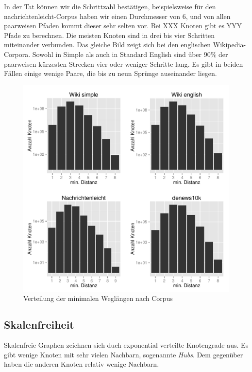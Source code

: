 \documentclass[11pt, a4paper]{article}
\begin{document}
In der Tat können wir die Schrittzahl bestätigen, beispielsweise für den
nachrichtenleicht-Corpus haben wir einen Durchmesser von 6, und von
allen paarweisen Pfaden kommt dieser sehr selten vor. Bei XXX Knoten gibt
es YYY Pfade zu berechnen. Die meisten Knoten sind in drei bis vier Schritten
miteinander verbunden.
Das gleiche Bild zeigt sich bei den englischen Wikipedia-Corpora. Sowohl in 
Simple als auch in Standard English sind über 90\% der paarweisen
kürzesten Strecken vier oder weniger Schritte lang. Es gibt in beiden Fällen 
einige wenige Paare, die bis zu neun Sprünge auseinander liegen.

\begin{figure}
    \centering
        \includegraphics[scale=.75]{mdh_plots.pdf}
    \caption{Verteilung der minimalen Weglängen nach Corpus}
    \label{fig-mdh}
\end{figure}

\subsection{Skalenfreiheit}
Skalenfreie Graphen zeichnen sich duch exponential verteilte Knotengrade aus.
Es gibt wenige Knoten mit sehr vielen Nachbarn, sogenannte \emph{Hubs}.
Dem gegenüber haben die anderen Knoten relativ wenige Nachbarn. 
\end{document}
